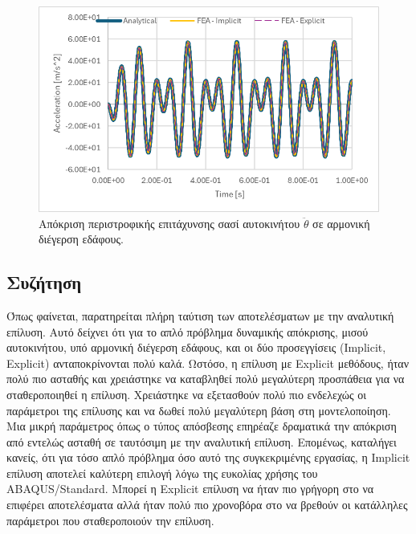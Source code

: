 \documentclass{article}
\begin{document}
\begin{figure}[H]
    \centering
    \includegraphics[width=0.8\linewidth]{media/a-th.png}
    \caption{Απόκριση περιστροφικής επιτάχυνσης σασί αυτοκινήτου $\ddot{\theta}$ σε αρμονική διέγερση εδάφους.}
    \label{fig:a-th}
\end{figure}

\subsection{Συζήτηση}
Όπως φαίνεται, παρατηρείται πλήρη ταύτιση των αποτελέσματων με την αναλυτική επίλυση. Αυτό δείχνει ότι για το απλό πρόβλημα δυναμικής απόκρισης, μισού αυτοκινήτου, υπό αρμονική διέγερση εδάφους, και οι δύο προσεγγίσεις (Implicit, Explicit) ανταποκρίνονται πολύ καλά. Ωστόσο, η επίλυση με Explicit μεθόδους, ήταν πολύ πιο ασταθής και χρειάστηκε να καταβληθεί πολύ μεγαλύτερη προσπάθεια για να σταθεροποιηθεί η επίλυση. Χρειάστηκε να εξετασθούν πολύ πιο ενδελεχώς οι παράμετροι της επίλυσης και να δωθεί πολύ μεγαλύτερη βάση στη μοντελοποίηση. Μια μικρή παράμετρος όπως ο τύπος απόσβεσης επηρέαζε δραματικά την απόκριση από εντελώς ασταθή σε ταυτόσιμη με την αναλυτική επίλυση. Επομένως, καταλήγει κανείς, ότι για τόσο απλό πρόβλημα όσο αυτό της συγκεκριμένης εργασίας, η Implicit επίλυση αποτελεί καλύτερη επιλογή λόγω της ευκολίας χρήσης του ABAQUS/Standard. Μπορεί η Explicit επίλυση να ήταν πιο γρήγορη στο να επιφέρει αποτελέσματα αλλά ήταν πολύ πιο χρονοβόρα στο να βρεθούν οι κατάλληλες παράμετροι που σταθεροποιούν την επίλυση.













\listoffigures
\listoftables
\end{document}
